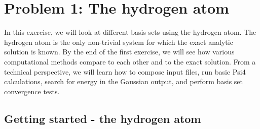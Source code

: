 
\section{Problem 1: The hydrogen atom} %
\label{sec:problemI}

In this exercise, we will look at different basis sets using the hydrogen atom. 
The hydrogen atom is the only non-trivial system for which the exact analytic solution is known. 
By the end of the first exercise, we will see how various computational methods compare to each other and to the exact solution.  
From a technical perspective, we will learn how to compose input files, run basic Psi4 calculations, search for energy in the Gaussian output, and perform basis set convergence tests.

\subsection*{Getting started - the hydrogen atom}


